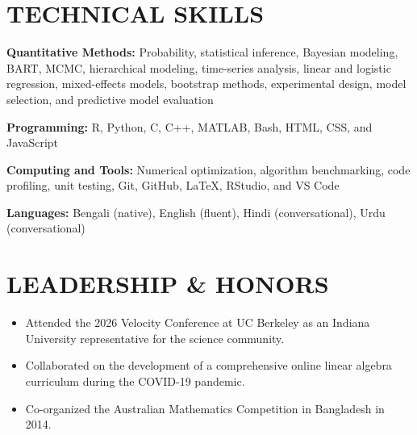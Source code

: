 \documentclass[10pt,letterpaper]{article}
\newenvironment{resumeItems}{%
	\begin{itemize}[
		label=\textbullet,
		leftmargin=14pt,
		labelsep=5pt,
		itemsep=0.5pt,
		topsep=1.0pt,
		parsep=0pt,
		partopsep=0pt
	]
}{%
	\end{itemize}
}
\begin{document}
\section*{TECHNICAL SKILLS}

\textbf{Quantitative Methods:}
Probability, statistical inference, Bayesian modeling, BART, MCMC, hierarchical modeling, time-series analysis, linear and logistic regression, mixed-effects models, bootstrap methods, experimental design, model selection, and predictive model evaluation

\textbf{Programming:}
R, Python, C, C++, MATLAB, Bash, HTML, CSS, and JavaScript

\textbf{Computing and Tools:}
Numerical optimization, algorithm benchmarking, code profiling, unit testing, Git, GitHub, LaTeX, RStudio, and VS Code

\textbf{Languages:}
Bengali (native), English (fluent), Hindi (conversational), Urdu (conversational)

\section*{LEADERSHIP \& HONORS}

\begin{resumeItems}
	\item Attended the 2026 Velocity Conference at UC Berkeley as an Indiana University representative for the science community.

	\item Collaborated on the development of a comprehensive online linear algebra curriculum during the COVID-19 pandemic.

	\item Co-organized the Australian Mathematics Competition in Bangladesh in 2014.
\end{resumeItems}
\end{document}
